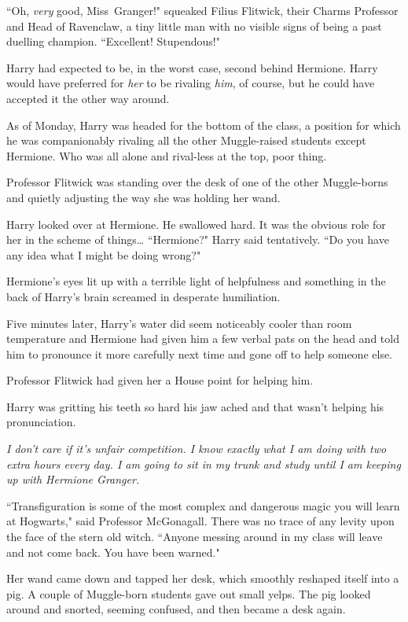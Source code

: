 ``Oh, \emph{very} good, Miss~Granger!" squeaked Filius Flitwick, their Charms Professor and Head of Ravenclaw, a tiny little man with no visible signs of being a past duelling champion. ``Excellent! Stupendous!"

Harry had expected to be, in the worst case, second behind Hermione. Harry would have preferred for \emph{her} to be rivaling \emph{him}, of course, but he could have accepted it the other way around.

As of Monday, Harry was headed for the bottom of the class, a position for which he was companionably rivaling all the other Muggle-raised students except Hermione. Who was all alone and rival-less at the top, poor thing.

Professor Flitwick was standing over the desk of one of the other Muggle-borns and quietly adjusting the way she was holding her wand.

Harry looked over at Hermione. He swallowed hard. It was the obvious role for her in the scheme of things{\ldots} ``Hermione?" Harry said tentatively. ``Do you have any idea what I might be doing wrong?"

Hermione's eyes lit up with a terrible light of helpfulness and something in the back of Harry's brain screamed in desperate humiliation.

Five minutes later, Harry's water did seem noticeably cooler than room temperature and Hermione had given him a few verbal pats on the head and told him to pronounce it more carefully next time and gone off to help someone else.

Professor Flitwick had given her a House point for helping him.

Harry was gritting his teeth so hard his jaw ached and that wasn't helping his pronunciation.

\emph{I don't care if it's unfair competition. I know exactly what I am doing with two extra hours every day. I am going to sit in my trunk and study until I am keeping up with Hermione Granger.}

\later

``Transfiguration is some of the most complex and dangerous magic you will learn at Hogwarts," said Professor McGonagall. There was no trace of any levity upon the face of the stern old witch. ``Anyone messing around in my class will leave and not come back. You have been warned."

Her wand came down and tapped her desk, which smoothly reshaped itself into a pig. A couple of Muggle-born students gave out small yelps. The pig looked around and snorted, seeming confused, and then became a desk again.

